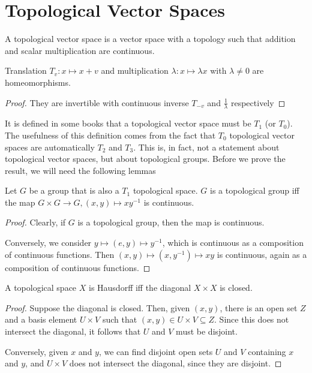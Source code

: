 \documentclass[prb,12pt]{revtex4-2}
\theoremstyle{definition}
\theoremstyle{definition}
\theoremstyle{definition}
\begin{document}
	\section{Topological Vector Spaces}
	\begin{Definition}
		A topological vector space is a vector space with a topology such that addition and scalar multiplication are continuous.
	\end{Definition}
	\begin{Theorem}
		Translation $T_v:x\mapsto x + v$ and multiplication $\lambda: x \mapsto \lambda x$ with $\lambda\neq0$ are homeomorphisms.
	\end{Theorem}
	\begin{proof}
		They are invertible with continuous inverse $T_{-v}$ and $\frac 1\lambda$ respectively
	\end{proof}
	It is defined in some books that a topological vector space must be $T_1$ (or $T_0$). The usefulness of this definition comes from the fact that $T_0$ topological vector spaces are automatically $T_2$ and $T_3$. This is, in fact, not a statement about topological vector spaces, but about topological groups. Before we prove the result, we will need the following lemmas
	\begin{Lemma}
		Let $G$ be a group that is also a $T_1$ topological space. $G$ is a topological group iff the map $G \times G \to G, (x,y)\mapsto xy^{-1}$ is continuous.
	\end{Lemma}
\begin{proof}
	Clearly, if $G$ is a topological group, then the map is continuous. 
	
	Conversely, we consider $y \mapsto (e,y) \mapsto y^{-1}$, which is continuous as a composition of continuous functions. Then $(x,y) \mapsto (x, y^{-1}) \mapsto xy$ is continuous, again as a composition of continuous functions.
\end{proof}
\begin{Lemma}
	A topological space $X$ is Hausdorff iff the diagonal $X\times X$ is closed.
\end{Lemma}
\begin{proof}
	Suppose the diagonal is closed. Then, given $(x,y)$, there is an open set $Z$ and a basis element $U\times V$ such that $(x,y)\in U\times V \subseteq Z$. Since this does not intersect the diagonal, it follows that $U$ and $V$ must be disjoint.
	
	Conversely, given $x$ and $y$, we can find disjoint open sets $U$ and $V$ containing $x$ and $y$, and $U\times V$ does not intersect the diagonal, since they are disjoint. 
\end{proof}
\end{document}
